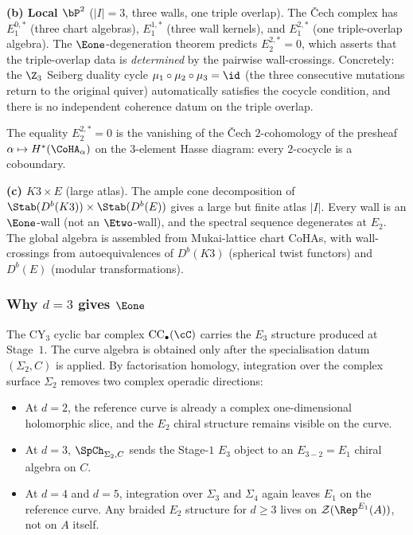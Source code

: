 \medskip
\noindent\textbf{(b) Local $\bP^2$} ($|I| = 3$, three walls, one triple overlap). The \v{C}ech complex has $E_1^{0,*}$ (three chart algebras), $E_1^{1,*}$ (three wall kernels), and $E_1^{2,*}$ (one triple-overlap algebra). The $\Eone$-degeneration theorem predicts $E_2^{2,*} = 0$, which asserts that the triple-overlap data is \emph{determined} by the pairwise wall-crossings. Concretely: the $\Z_3$ Seiberg duality cycle $\mu_1 \circ \mu_2 \circ \mu_3 = \id$ (the three consecutive mutations return to the original quiver) automatically satisfies the cocycle condition, and there is no independent coherence datum on the triple overlap.

The equality $E_2^{2,*} = 0$ is the vanishing of the \v{C}ech
$2$-cohomology of the presheaf
$\alpha \mapsto H^*(\CoHA_\alpha)$ on the $3$-element Hasse diagram:
every $2$-cocycle is a coboundary.

\medskip
\noindent\textbf{(c) $K3 \times E$} (large atlas). The ample cone decomposition of $\Stab(D^b(K3)) \times \Stab(D^b(E))$ gives a large but finite atlas $|I|$. Every wall is an $\Eone$-wall (not an $\Etwo$-wall), and the spectral sequence degenerates at $E_2$. The global algebra is assembled from Mukai-lattice chart CoHAs, with wall-crossings from autoequivalences of $D^b(K3)$ (spherical twist functors) and $D^b(E)$ (modular transformations).

\medskip

\subsubsection{Why \texorpdfstring{$d = 3$}{d = 3} gives \texorpdfstring{$\Eone$}{E1}}
\label{subsubsec:why-d3-gives-e1}

The CY$_3$ cyclic bar complex $\mathrm{CC}_\bullet(\cC)$ carries the
$E_3$ structure produced at Stage~$1$. The curve algebra is obtained
only after the specialisation datum $(\Sigma_2,C)$ is applied. By
factorisation homology, integration over the complex surface
$\Sigma_2$ removes two complex operadic directions:
\begin{itemize}
 \item At $d=2$, the reference curve is already a complex
 one-dimensional holomorphic slice, and the $E_2$ chiral structure
 remains visible on the curve.
 \item At $d=3$, $\SpCh_{\Sigma_2,C}$ sends the Stage-$1$ $E_3$
 object to an $E_{3-2}=E_1$ chiral algebra on $C$.
 \item At $d=4$ and $d=5$, integration over $\Sigma_3$ and
 $\Sigma_4$ again leaves $E_1$ on the reference curve. Any
 braided $E_2$ structure for $d\geq3$ lives on
 $\mathcal Z(\Rep^{E_1}(A))$, not on $A$ itself.
\end{itemize}

